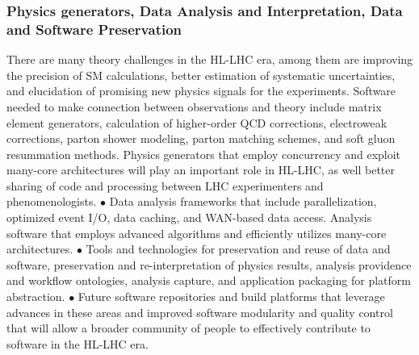 \begin{frame}
\frametitle{ Physics generators, Data Analysis and Interpretation, Data and Software Preservation}
\scriptsize{ 
There are many theory challenges in the HL-LHC era, among them are
improving the precision of SM calculations, better estimation of
systematic uncertainties, and elucidation of promising new physics
signals for the experiments. Software needed to make connection
between observations and theory include matrix element generators,
calculation of higher-order QCD corrections, electroweak
corrections, parton shower modeling, parton matching schemes, and
soft gluon resummation methods. Physics generators that employ
concurrency and exploit many-core architectures will play an
important role in HL-LHC, as well better sharing of code and
processing between LHC experimenters and phenomenologists. $\bullet$ Data
analysis frameworks that include parallelization, optimized event
I/O, data caching, and WAN-based data access. Analysis software
that employs advanced algorithms and efficiently utilizes many-core
architectures. $\bullet$ Tools and technologies for preservation and reuse of
data and software, preservation and re-interpretation of physics
results, analysis providence and workflow ontologies, analysis
capture, and application packaging for platform abstraction. $\bullet$ Future
software repositories and build platforms that leverage advances in
these areas and improved software modularity and quality control
that will allow a broader community of people to effectively
contribute to software in the HL-LHC era.}

\end{frame}



